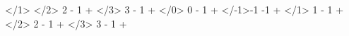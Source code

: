 \par\noindent \CurrentFile
\mySection</1>{         \myRLTVLevelBaseExpected}
\mySection</2>{ 2 - 1 + \myRLTVLevelBaseExpected}
\mySection</3>{ 3 - 1 + \myRLTVLevelBaseExpected}
\mySection</0>{ 0 - 1 + \myRLTVLevelBaseExpected}
\mySection</-1>{-1 -1 + \myRLTVLevelBaseExpected}
\mySection</1>{ 1 - 1 + \RLTVLevelBase}
\mySection</2>{ 2 - 1 + \RLTVLevelBase}
\mySection</3>{ 3 - 1 + \RLTVLevelBase}
